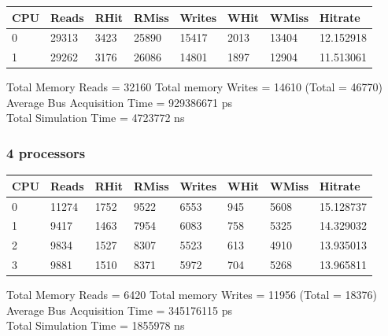 \documentclass[]{article}
\begin{document}
\begin{table}[H]
	\begin{tabular}{|l|l|l|l|l|l|l|l|}
		\hline
		\textbf{CPU} & \textbf{Reads} & \textbf{RHit} & \textbf{RMiss} & \textbf{Writes} & \textbf{WHit} & \textbf{WMiss} & \textbf{Hitrate} \\ \hline
		0            & 29313          & 3423          & 25890          & 15417           & 2013          & 13404          & 12.152918        \\ \hline
		1            & 29262          & 3176          & 26086          & 14801           & 1897          & 12904          & 11.513061        \\ \hline
	\end{tabular}
\end{table}


Total Memory Reads = 32160 Total memory Writes = 14610 (Total = 46770)\\
Average Bus Acquisition Time = 929386671 ps\\
Total Simulation Time = 4723772 ns

\subsubsection{4 processors}

\begin{table}[H]
	\begin{tabular}{|l|l|l|l|l|l|l|l|}
		\hline
		\textbf{CPU} & \textbf{Reads} & \textbf{RHit} & \textbf{RMiss} & \textbf{Writes} & \textbf{WHit} & \textbf{WMiss} & \textbf{Hitrate} \\ \hline
		0            & 11274          & 1752          & 9522           & 6553            & 945           & 5608           & 15.128737        \\ \hline
		1            & 9417           & 1463          & 7954           & 6083            & 758           & 5325           & 14.329032        \\ \hline
		2            & 9834           & 1527          & 8307           & 5523            & 613           & 4910           & 13.935013        \\ \hline
		3            & 9881           & 1510          & 8371           & 5972            & 704           & 5268           & 13.965811        \\ \hline
	\end{tabular}
\end{table}

Total Memory Reads = 6420 Total memory Writes = 11956 (Total = 18376)\\
Average Bus Acquisition Time = 345176115 ps\\
Total Simulation Time = 1855978 ns
\end{document}
